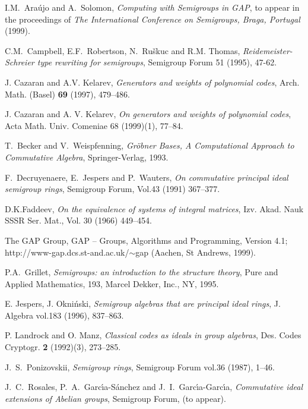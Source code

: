 \documentclass{acmconf}
\def\gap{\sf GAP}
\begin{document}
\begin{thebibliography}{9}

 I.M.~Ara\'ujo and A.~Solomon, 
{\em Computing with Semigroups in GAP},
to appear in the proceedings of {\em The International Conference on
Semigroups, Braga, Portugal}  (1999).

C.M.~Campbell, E.F.~Robertson, N.~Ru\v{s}kuc and  R.M. Thomas,
{\it Reidemeister-Schreier type rewriting for semigroups},
Semigroup Forum 51 (1995), 47-62.


J. Cazaran and A.V. Kelarev,
{\it Generators and weights of polynomial codes},
Arch. Math. (Basel) {\bf 69} (1997), 479--486.

J. Cazaran and A. V. Kelarev,
{\it On generators and weights of polynomial codes},
Acta Math. Univ. Comeniae 68 (1999)(1), 77--84.


T.~Becker and V.~Weispfenning, 
{\it Gr\"{o}bner Bases, A Computational Approach to Commutative Algebra}, 
Springer-Verlag, 1993.


   F.~Decruyenaere, E.~Jespers and P.~Wauters, 
        \emph{On commutative principal ideal semigroup rings},
   Semigroup Forum, Vol.43 (1991) 367--377.

D.K.Faddeev,  
\emph{On the equivalence of systems of integral matrices},
Izv. Akad. Nauk SSSR Ser. Mat., Vol. 30 (1966) 449--454. 

 The GAP Group, {\gap} -- Groups, Algorithms and Programming,
Version 4.1; http://www-gap.dcs.st-and.ac.uk/$\sim$gap (Aachen, St Andrews,
1999).

 P.A.~Grillet,
 \emph{Semigroups: an introduction to the structure theory},
 Pure and Applied Mathematics, 193,
 Marcel Dekker, Inc., NY, 1995.

 E. Jespers, J. Okni\'{n}ski, 
\emph{Semigroup algebras that are principal ideal rings}, 
J. Algebra vol.183 (1996), 837--863.

P. Landrock and  O. Manz,
{\it Classical codes as ideals in group algebras},
Des. Codes Cryptogr. {\bf 2} (1992)(3), 273--285.


 J.~S.~Ponizovskii, 
\emph{Semigroup rings}, Semigroup Forum vol.36 (1987), 1--46.


   J.~C.~Rosales, P.~A.~Garc\'{\i}a-S\'{a}nchez and 
        J.~I.~Garc\'{\i}a-Garc\'{\i}a,
  \emph{Commutative ideal extensions of Abelian groups},
   Semigroup Forum, (to appear).



\end{thebibliography}
\end{document}
